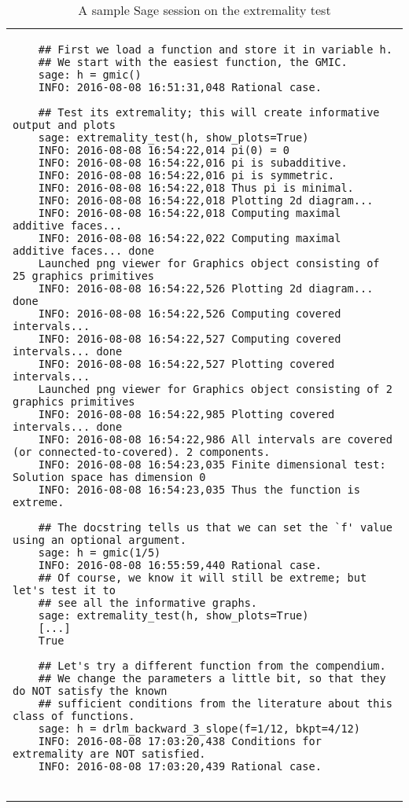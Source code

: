 \documentclass[suppldata]{gOMS2e}   %
\begin{document}
\setcounter{table}{2}
\begin{table}
  \caption{A sample Sage session on the extremality test}
  \label{tab:extremality_test}
  \tiny %
  \begin{tabular}{@{}p{\linewidth}@{}}
    \toprule
	\begin{verbatim}
	## First we load a function and store it in variable h.
	## We start with the easiest function, the GMIC.
	sage: h = gmic()
	INFO: 2016-08-08 16:51:31,048 Rational case.
	
	## Test its extremality; this will create informative output and plots
	sage: extremality_test(h, show_plots=True)
	INFO: 2016-08-08 16:54:22,014 pi(0) = 0
	INFO: 2016-08-08 16:54:22,016 pi is subadditive.
	INFO: 2016-08-08 16:54:22,016 pi is symmetric.
	INFO: 2016-08-08 16:54:22,018 Thus pi is minimal.
	INFO: 2016-08-08 16:54:22,018 Plotting 2d diagram...
	INFO: 2016-08-08 16:54:22,018 Computing maximal additive faces...
	INFO: 2016-08-08 16:54:22,022 Computing maximal additive faces... done
	Launched png viewer for Graphics object consisting of 25 graphics primitives
	INFO: 2016-08-08 16:54:22,526 Plotting 2d diagram... done
	INFO: 2016-08-08 16:54:22,526 Computing covered intervals...
	INFO: 2016-08-08 16:54:22,527 Computing covered intervals... done
	INFO: 2016-08-08 16:54:22,527 Plotting covered intervals...
	Launched png viewer for Graphics object consisting of 2 graphics primitives
	INFO: 2016-08-08 16:54:22,985 Plotting covered intervals... done
	INFO: 2016-08-08 16:54:22,986 All intervals are covered (or connected-to-covered). 2 components.
	INFO: 2016-08-08 16:54:23,035 Finite dimensional test: Solution space has dimension 0
	INFO: 2016-08-08 16:54:23,035 Thus the function is extreme.
	
	## The docstring tells us that we can set the `f' value using an optional argument.
	sage: h = gmic(1/5)
	INFO: 2016-08-08 16:55:59,440 Rational case.
	## Of course, we know it will still be extreme; but let's test it to
	## see all the informative graphs.
	sage: extremality_test(h, show_plots=True)
	[...]
	True

	## Let's try a different function from the compendium. 
	## We change the parameters a little bit, so that they do NOT satisfy the known
	## sufficient conditions from the literature about this class of functions.
	sage: h = drlm_backward_3_slope(f=1/12, bkpt=4/12)
	INFO: 2016-08-08 17:03:20,438 Conditions for extremality are NOT satisfied.
	INFO: 2016-08-08 17:03:20,439 Rational case.
	

\end{verbatim}
\end{tabular}
\end{table}
\end{document}
